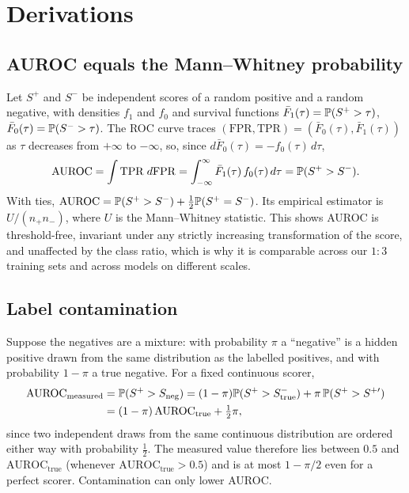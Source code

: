 \section{Derivations}
\label{app:deriv}

\subsection{AUROC equals the Mann--Whitney probability}
Let $S^{+}$ and $S^{-}$ be independent scores of a random positive and a random negative, with densities $f_1$ and $f_0$ and survival functions $\bar F_1(\tau)=\mathbb{P}(S^{+}>\tau)$, $\bar F_0(\tau)=\mathbb{P}(S^{-}>\tau)$. The ROC curve traces $(\mathrm{FPR},\mathrm{TPR})=(\bar F_0(\tau),\bar F_1(\tau))$ as $\tau$ decreases from $+\infty$ to $-\infty$, so, since $d\bar F_0(\tau)=-f_0(\tau)\,d\tau$,
\begin{equation}
\mathrm{AUROC}=\int \mathrm{TPR}\;d\mathrm{FPR}=\int_{-\infty}^{\infty}\bar F_1(\tau)\,f_0(\tau)\,d\tau=\mathbb{P}(S^{+}>S^{-}).
\end{equation}
With ties, $\mathrm{AUROC}=\mathbb{P}(S^{+}>S^{-})+\tfrac12\mathbb{P}(S^{+}=S^{-})$. Its empirical estimator is $U/(n_+n_-)$, where $U$ is the Mann--Whitney statistic. This shows AUROC is threshold-free, invariant under any strictly increasing transformation of the score, and unaffected by the class ratio, which is why it is comparable across our $1{:}3$ training sets and across models on different scales.

\subsection{Label contamination}
Suppose the negatives are a mixture: with probability $\pi$ a ``negative'' is a hidden positive drawn from the same distribution as the labelled positives, and with probability $1-\pi$ a true negative. For a fixed continuous scorer,
\begin{align}
\mathrm{AUROC}_{\text{measured}}&=\mathbb{P}(S^{+}>S_{\text{neg}})=(1-\pi)\mathbb{P}(S^{+}>S^{-}_{\text{true}})+\pi\,\mathbb{P}(S^{+}>S^{+\prime})\notag\\
&=(1-\pi)\,\mathrm{AUROC}_{\text{true}}+\tfrac12\pi,
\label{eq:contam}
\end{align}
since two independent draws from the same continuous distribution are ordered either way with probability $\tfrac12$. The measured value therefore lies between $0.5$ and $\mathrm{AUROC}_{\text{true}}$ (whenever $\mathrm{AUROC}_{\text{true}}>0.5$) and is at most $1-\pi/2$ even for a perfect scorer. Contamination can only lower AUROC.

